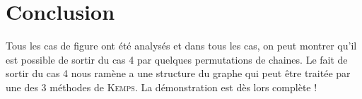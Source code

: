 \documentclass[french]{report}
\begin{document}
	\def \axeline {dotted}
	\def\changemargin#1#2{\list{}{\rightmargin#2\leftmargin#1}\item[]}
	\let\endchangemargin=\endlist 




\newpage
{}

\tableofcontents

 




\section{Conclusion}
Tous les cas de figure ont été analysés et dans tous les cas, on peut montrer qu'il est possible de sortir du cas 4 par quelques permutations de chaines. Le fait de sortir du cas 4 nous ramène a une structure du graphe qui peut être traitée par une des 3 méthodes de \textsc{Kemps}. 
La démonstration est dès lors complète !
\end{document}
